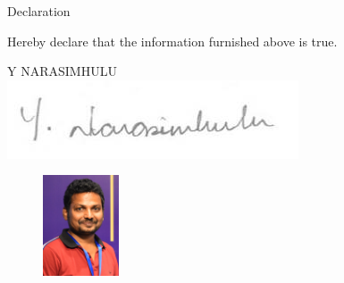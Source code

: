 \documentclass{resume} %
\begin{document}
\pagebreak
\begin{rSection}{Declaration}
	
	\begin{rSubsection}{}{}{}{}	
		\item[] Hereby declare that the information furnished above is true.
	\end{rSubsection}

	\vspace{1cm}

	\begin{flushright}
		Y NARASIMHULU \\
		\includegraphics[scale=0.75]{signature.jpg}
	\end{flushright}


\begin{figure}[!hbt]
		\begin{flushright}
			\includegraphics[width=0.2\textwidth]{Narasimpassport.png}
		\end{flushright}
\end{figure}

	
\end{rSection}




\end{document}
